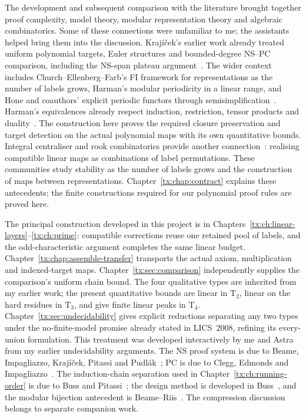 \newpage
The development and subsequent comparison with the literature brought
together proof complexity, model theory, modular representation theory
and algebraic combinatorics. Some of these connections were unfamiliar
to me; the assistants helped bring them into the discussion.
Kraj\'i\v cek's earlier work already treated uniform polynomial targets,
Euler structures and bounded-degree NS--PC comparison, including the
NS-span plateau argument~\cite{KrajEuler}\cite[Theorem~5.5]{Krajicek}. The wider context
includes Church--Ellenberg--Farb's FI framework for representations as
the number of labels grows, Harman's modular periodicity in a linear
range, and Hone and coauthors' explicit periodic functors through
semisimplification~\cite{CEF,Harman,HKPSYZ}. Harman's equivalences
already respect induction, restriction, tensor products and
duality~\cite[Propositions~2.7 and~2.12]{Harman}. The construction
here proves the required closure preservation and target detection
on the actual polynomial maps with its own quantitative bounds.
Integral centraliser and
rook combinatorics provide another connection~\cite{BDM}: realising
compatible linear maps as combinations of label permutations. These
communities study stability as the number of labels grows and the
construction of maps between representations.
Chapter~\ref{tx:chap:contract} explains these antecedents; the finite
constructions required for our polynomial proof rules are proved here.

The principal construction developed in this project is in
Chapters~\ref{tx:ch:linear-layers}--\ref{tx:ch:prime}: compatible
corrections reuse one retained pool of labels, and the odd-characteristic
argument completes the same linear budget.
Chapter~\ref{tx:chap:assemble-transfer} transports the actual axiom,
multiplication and indexed-target maps.
Chapter~\ref{tx:sec:comparison} independently supplies the comparison's
uniform chain bound. The four qualitative types are inherited from my
earlier work; the present quantitative bounds are linear in
$\mathrm T_2$, linear on the hard residues in $\mathrm T_3$, and give
finite linear peaks in $\mathrm T_4$.
Chapter~\ref{tx:sec:undecidability} gives explicit reductions separating
any two types under the no-finite-model promise already stated in
LICS~2008, refining its every-union formulation. This treatment was
developed interactively by me and Astra from my earlier undecidability
arguments. The NS proof system is due to Beame, Impagliazzo,
Kraj\'i\v cek, Pitassi and Pudl\'ak~\cite{NSFoundations}; PC is due
to Clegg, Edmonds and Impagliazzo~\cite{PCFoundations}.
The induction-chain separation used in
Chapter~\ref{tx:ch:running-order} is due to Buss and
Pitassi~\cite{BussPitassiInduction}; the design method is developed
in Buss~\cite{BussDesign}, and the modular bijection antecedent is
Beame--Riis~\cite{BeameRiis}. The compression discussion belongs to
separate companion work.

